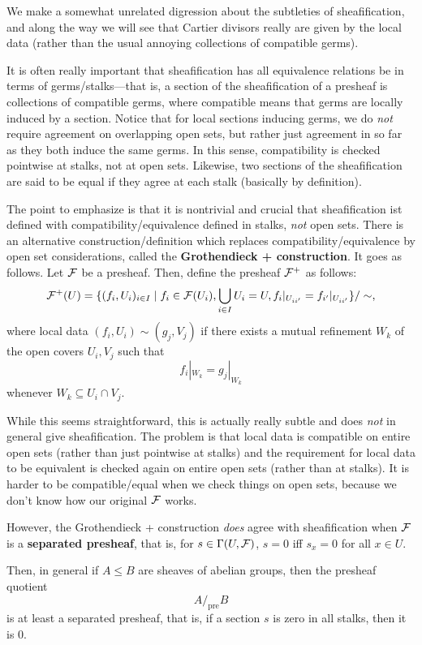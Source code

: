 \documentclass[12pt]{article}
\begin{document}
\begin{rmk}
    We make a somewhat unrelated digression about the subtleties of sheafification, and along the way we will see that Cartier divisors really are given by the local data (rather than the usual annoying collections of compatible germs).
    
    It is often really important that sheafification has all equivalence relations be in terms of germs/stalks---that is, a section of the sheafification of a presheaf is collections of compatible germs, where compatible means that germs are locally induced by a section. Notice that for local sections inducing germs, we do \textit{not} require agreement on overlapping open sets, but rather just agreement in so far as they both induce the same germs. In this sense, compatibility is checked pointwise at stalks, not at open sets. Likewise, two sections of the sheafification are said to be equal if they agree at each stalk (basically by definition).

    The point to emphasize is that it is nontrivial and crucial that sheafification ist defined with compatibility/equivalence defined in stalks, \textit{not} open sets. There is an alternative construction/definition which replaces compatibility/equivalence by open set considerations,  called the \textbf{Grothendieck + construction}. It goes as follows. Let $\mathcal{F}$ be a presheaf. Then, define the presheaf $\mathcal{F}^+$ as follows:
    \[\mathcal{F}^+(U) = \{(f_i,U_i)_{i\in I} \mid f_i \in \mathcal{F}(U_i), \bigcup_{i\in I} U_i = U, f_i|_{U_{ii'}} = f_{i'}|_{U_{ii'}}\}/\sim,\]
    where local data $(f_i,U_i) \sim (g_j,V_j)$ if there exists a mutual refinement $W_k$ of the open covers $U_i,V_j$ such that
    \[f_i|_{W_k} = g_j|_{W_k}\]
    whenever $W_k \subseteq U_i\cap V_j$.

    While this seems straightforward, this is actually really subtle and does \textit{not} in general give sheafification. The problem is that local data is compatible on entire open sets (rather than just pointwise at stalks) and the requirement for local data to be equivalent is checked again on entire open sets (rather than at stalks). It is harder to be compatible/equal when we check things on open sets, because we don't know how our original $\mathcal{F}$ works.

    However, the Grothendieck + construction \textit{does} agree with sheafification when $\mathcal{F}$ is a \textbf{separated presheaf}, that is, for $s\in \Gamma(U,\mathcal{F})$, $s=0$ iff $s_x = 0$ for all $x\in U$.
    
    Then, in general if $A\leq B$ are sheaves of abelian groups, then the presheaf quotient
    \[A/_{\mathrm{pre}}B\]
    is at least a separated presheaf, that is, if a section $s$ is zero in all stalks, then it is 0.
    

\end{rmk}
\end{document}
